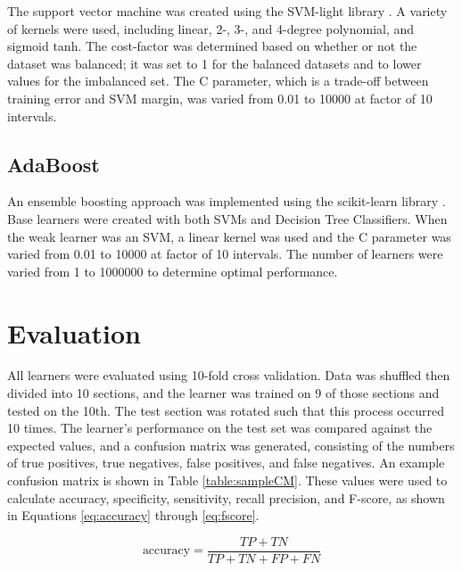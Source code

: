 \documentclass[draftcopy]{srpaper}
\begin{document}
The support vector machine was created using the SVM-light library \cite{svmlight}. A
variety of kernels were used, including linear, 2-, 3-, and 4-degree
polynomial, and sigmoid tanh. The cost-factor was determined based on whether
or not the dataset was balanced; it was set to 1 for the
balanced datasets and to lower values for the imbalanced set. The C
parameter, which is a trade-off between training error and SVM margin,
was varied from 0.01 to 10000 at factor of 10 intervals.


\section{AdaBoost}
An ensemble boosting approach was implemented using the scikit-learn
library \cite{scikitlearn}. Base learners were created with both SVMs and Decision Tree
Classifiers. When the weak learner was an SVM, a linear kernel was
used and the C parameter was varied from 0.01 to 10000 at factor of 10
intervals. The number of learners were varied from 1 to 1000000 to
determine optimal performance.


\chapter{Evaluation}
\label{Chapter:Four}
All learners were evaluated using 10-fold cross validation. Data was
shuffled then 
divided into 10 sections, and the learner was trained on 9 of those
sections and tested on the 10th. The test section was rotated such
that this process occurred 10 times. The learner's performance on the
test set was compared against the expected values, and a confusion
matrix was generated, consisting of the numbers of true positives,
true negatives, false positives, and false negatives. An example
confusion matrix is shown in Table \ref{table:sampleCM}. These values
were used to calculate accuracy, specificity, sensitivity, recall precision, and F-score, as shown in Equations \ref{eq:accuracy}
through \ref{eq:fscore}.

\begin{equation}
\mbox{accuracy} = \frac{TP + TN}{TP + TN + FP + FN}
\label{eq:accuracy}
\end{equation}
\end{document}
